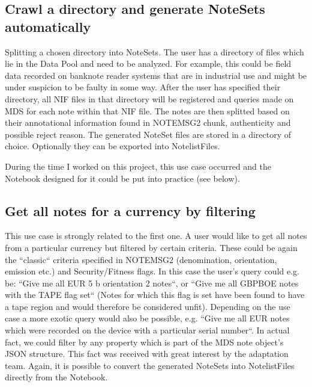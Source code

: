 \subsection{Crawl a directory and generate NoteSets automatically}
Splitting a chosen directory into NoteSets. The user has a directory of files which lie in the Data Pool and need to be analyzed. For example, this could be field data recorded on banknote reader systems that are in industrial use and might be under suspicion to be faulty in some way. After the user has specified their directory, all NIF files in that directory will be registered and queries made on MDS for each note within that NIF file. The notes are then splitted based on their annotational information found in NOTEMSG2 chunk, authenticity and possible reject reason. The generated NoteSet files are stored in a directory of choice. Optionally they can be exported into NotelistFiles.\par
During the time I worked on this project, this use case occurred and the Notebook designed for it could be put into practice (see below).
\subsection{Get all notes for a currency by filtering}
This use case is strongly related to the first one. A user would like to get all notes from a particular currency but filtered by certain criteria. These could be again the ``classic`` criteria specified in NOTEMSG2 (denomination, orientation, emission etc.) and Security/Fitness flags. In this case the user's query could e.g. be: ``Give me all EUR 5 b orientation 2 notes``, or ``Give me all GBPBOE notes with the TAPE flag set`` (Notes for which this flag is set have been found to have a tape region and would therefore be considered unfit). Depending on the use case a more exotic query would also be possible, e.g. ``Give me all EUR notes which were recorded on the device with a particular serial number``. In actual fact, we could filter by any property which is part of the MDS note object's JSON structure. This fact was received with great interest by the adaptation team. Again, it is possible to convert the generated NoteSets into NotelistFiles directly from the Notebook.
